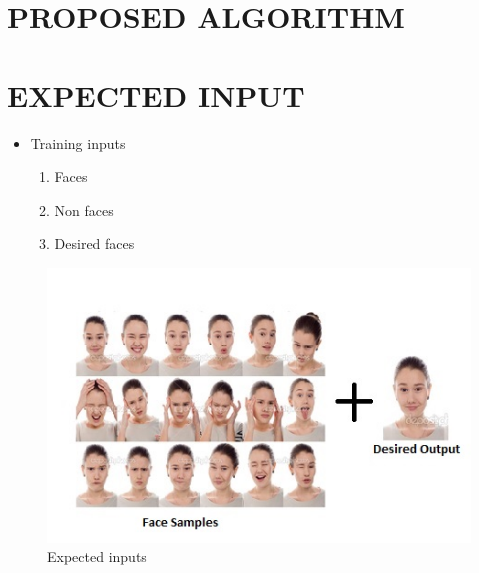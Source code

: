 \documentclass[11pt,a4paper,twoside]{report}
\begin{document}
\chapter{PROPOSED ALGORITHM}
\begin{enumerate}

\end{enumerate}
\chapter{EXPECTED INPUT}
\begin{itemize}
\item Training inputs
\begin{enumerate}
\item Faces
\item Non faces
\item Desired faces
\end{enumerate}

\end{itemize}
\begin{figure}[htpb]
\begin{center}
\includegraphics[scale=1]{input.jpg}
\caption{Expected inputs}
\end{center}
\end{figure}
\newpage
\end{document}
